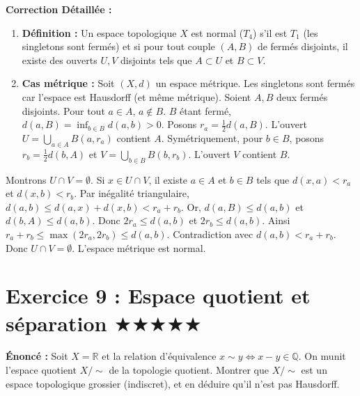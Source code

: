 \documentclass[11pt,a4paper]{article}
\begin{document}
\textbf{Correction Détaillée :}
\begin{enumerate}
\item \textbf{Définition :} Un espace topologique $X$ est normal ($T_4$) s'il est $T_1$ (les singletons sont fermés) et si pour tout couple $(A, B)$ de fermés disjoints, il existe des ouverts $U, V$ disjoints tels que $A \subset U$ et $B \subset V$.

\item \textbf{Cas métrique :} Soit $(X, d)$ un espace métrique. Les singletons sont fermés car l'espace est Hausdorff (et même métrique). Soient $A, B$ deux fermés disjoints. Pour tout $a \in A$, $a \notin B$. $B$ étant fermé, $d(a, B) = \inf_{b \in B} d(a, b) > 0$. Posons $r_a = \frac{1}{2} d(a, B)$. L'ouvert $U = \bigcup_{a \in A} B(a, r_a)$ contient $A$. Symétriquement, pour $b \in B$, posons $r_b = \frac{1}{2} d(b, A)$ et $V = \bigcup_{b \in B} B(b, r_b)$. L'ouvert $V$ contient $B$.
\end{enumerate}
Montrons $U \cap V = \emptyset$. Si $x \in U \cap V$, il existe $a \in A$ et $b \in B$ tels que $d(x, a) < r_a$ et $d(x, b) < r_b$. Par inégalité triangulaire, $d(a, b) \le d(a, x) + d(x, b) < r_a + r_b$.
Or, $d(a, B) \le d(a, b)$ et $d(b, A) \le d(a, b)$. Donc $2r_a \le d(a, b)$ et $2r_b \le d(a, b)$. Ainsi $r_a + r_b \le \max(2r_a, 2r_b) \le d(a, b)$. Contradiction avec $d(a, b) < r_a + r_b$.
Donc $U \cap V = \emptyset$. L'espace métrique est normal.





\section{Exercice 9 : Espace quotient et séparation \quad $\bigstar\bigstar\bigstar\bigstar\bigstar$}


\textbf{Énoncé :}
Soit $X = \mathbb{R}$ et la relation d'équivalence $x \sim y \iff x - y \in \mathbb{Q}$. On munit l'espace quotient $X / \sim$ de la topologie quotient. Montrer que $X / \sim$ est un espace topologique grossier (indiscret), et en déduire qu'il n'est pas Hausdorff.
\end{document}
